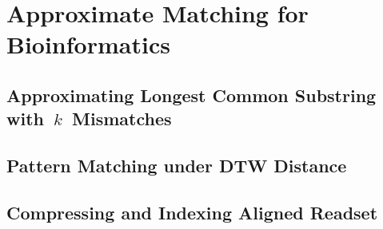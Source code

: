 \part{Approximate Matching for Bioinformatics}\label{part:approx-bio}

\clearemptydoublepage
\chapter{Approximating Longest Common Substring with~\texorpdfstring{$k$}{k}~Mismatches}\label{chap:LCS}%

\clearemptydoublepage
\chapter{Pattern Matching under DTW Distance}\label{chap:DTW}

\clearemptydoublepage
\chapter{Compressing and Indexing Aligned Readset}\label{chap:XBWT}
